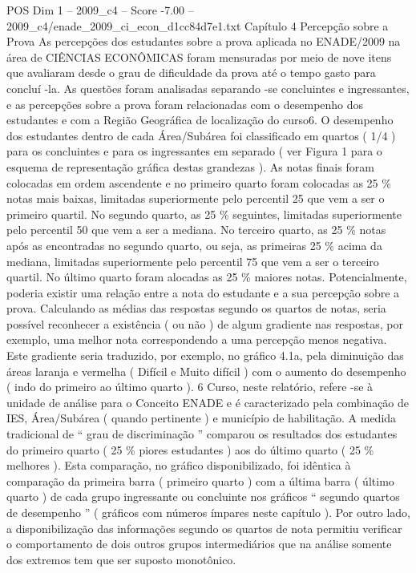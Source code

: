 \begin{textsample}{POS Dim 1 – 2009\_c4 – Score -7.00 – 2009\_c4/enade\_2009\_ci\_econ\_d1cc84d7e1.txt}  \label{ex:f1_pos_414}
Capítulo 4 Percepção sobre a Prova As percepções dos estudantes sobre a prova aplicada no ENADE/2009 na área de CIÊNCIAS ECONÔMICAS foram mensuradas por meio de nove itens que avaliaram desde o grau de dificuldade da prova até o tempo gasto para concluí -la.
As questões foram analisadas separando -se concluintes e ingressantes, e as percepções sobre a prova foram relacionadas com o desempenho dos estudantes e com a Região Geográfica de localização do curso6.
O desempenho dos estudantes dentro de cada Área/Subárea foi classificado em quartos ( 1/4 ) para os concluintes e para os ingressantes em separado ( ver Figura 1 para o esquema de representação gráfica destas grandezas ).
As notas finais foram colocadas em ordem ascendente e no primeiro quarto foram colocadas as 25 \% notas mais baixas, limitadas superiormente pelo percentil 25 que vem a ser o primeiro quartil.
No segundo quarto, as 25 \% seguintes, limitadas superiormente pelo percentil 50 que vem a ser a mediana.
No terceiro quarto, as 25 \% notas após as encontradas no segundo quarto, ou seja, as primeiras 25 \% acima da mediana, limitadas superiormente pelo percentil 75 que vem a ser o terceiro quartil.
No último quarto foram alocadas as 25 \% maiores notas.
Potencialmente, poderia existir uma relação entre a nota do estudante e a sua percepção sobre a prova.
Calculando as médias das respostas segundo os quartos de notas, seria possível reconhecer a existência ( ou não ) de algum gradiente nas respostas, por exemplo, uma melhor nota correspondendo a uma percepção menos negativa.
Este gradiente seria traduzido, por exemplo, no gráfico 4.1a, pela diminuição das áreas laranja e vermelha ( Difícil e Muito difícil ) com o aumento do desempenho ( indo do primeiro ao último quarto ). 6 Curso, neste relatório, refere -se à unidade de análise para o Conceito ENADE e é caracterizado pela combinação de IES, Área/Subárea ( quando pertinente ) e município de habilitação.
A medida tradicional de “ grau de discriminação ” comparou os resultados dos estudantes do primeiro quarto ( 25 \% piores estudantes ) aos do último quarto ( 25 \% melhores ).
Esta comparação, no gráfico disponibilizado, foi idêntica à comparação da primeira barra ( primeiro quarto ) com a última barra ( último quarto ) de cada grupo ingressante ou concluinte nos gráficos “ segundo quartos de desempenho ” ( gráficos com números ímpares neste capítulo ).
Por outro lado, a disponibilização das informações segundo os quartos de nota permitiu verificar o comportamento de dois outros grupos intermediários que na análise somente dos extremos tem que ser suposto monotônico.

\end{textsample}
